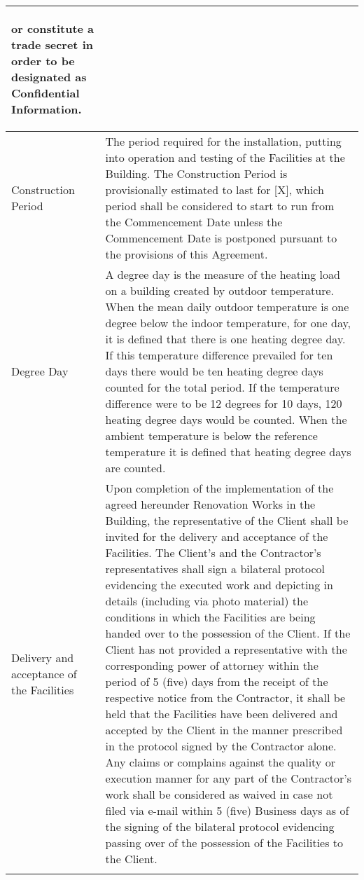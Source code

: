 \begin{center}
\begin{longtabu}{|X|X[3]|}
\begin{itemize}
						or constitute a trade secret in order to be designated as Confidential Information.
					\end{itemize} \\ \hline{}
	Construction Period & The period required for the installation, putting
			      into operation and testing of the Facilities at the Building. The Construction
			      Period is provisionally estimated to last for [X], which period shall be
			      considered to start to run from the Commencement Date unless the Commencement
			      Date is postponed pursuant to the provisions of this Agreement. \\ \hline{}
	Degree Day & A degree day is the measure of the heating load on a
		     building created by outdoor temperature. When the mean daily outdoor
		     temperature is one degree below the indoor temperature, for one day, it is
		     defined that there is one heating degree day. If this temperature difference
		     prevailed for ten days there would be ten heating degree days counted for the
		     total period. If the temperature difference were to be 12 degrees for 10 days,
		     120 heating degree days would be counted. When the ambient temperature is below
		     the reference temperature it is defined that heating degree days are counted. \\ \hline{}
	Delivery and acceptance of the Facilities & Upon completion of the implementation of the agreed hereunder Renovation Works
						    in the Building, the representative of the Client shall be invited for the delivery
						    and acceptance of the Facilities. The Client’s and the Contractor’s representatives shall sign
						    a bilateral protocol evidencing the executed work and depicting in details
						    (including via photo material) the conditions in which the Facilities are being
						    handed over to the possession of the Client.
						    If the Client has not provided a representative with the corresponding power of
						    attorney within the period of 5 (five) days from the receipt of the respective
						    notice from the Contractor, it shall be held that the Facilities have been
						    delivered and accepted by the Client in the manner prescribed in the protocol
						    signed by the Contractor alone.
						    Any claims or complains against the quality or execution manner for any part of
						    the Contractor’s work shall be considered as waived in case not filed via
						    e{-}mail within 5 (five) Business days as of the signing of the bilateral
						    protocol evidencing passing over of the possession of the Facilities to the Client.	\\ \hline{}

\end{longtabu}
\end{center}
